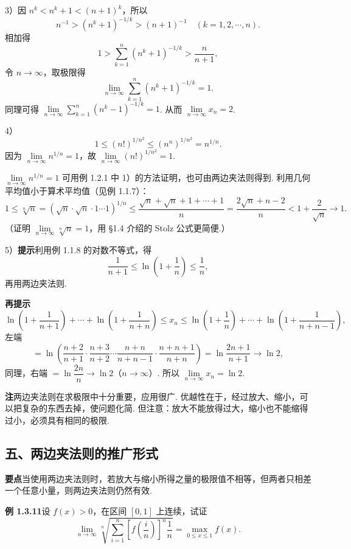 \documentclass[UTF8,12pt,a4paper,fontset=fandol]{ctexart}
\begin{document}
3）因 $n^k<n^k+1<(n+1)^k$，所以
\[
  n^{-1}>(n^k+1)^{-1/k}>(n+1)^{-1}\quad(k=1,2,\cdots,n).
\]
相加得
\[
  1>\sum_{k=1}^n(n^k+1)^{-1/k}>\frac n{n+1},
\]
令 $n\to\infty$，取极限得
\[
  \lim_{n\to\infty}\sum_{k=1}^n(n^k+1)^{-1/k}=1.
\]
同理可得 $\lim\limits_{n\to\infty}\sum\limits_{k=1}^n(n^k-1)^{-1/k}=1$. 从而 $\lim\limits_{n\to\infty}x_n=2$.

4）
\[
  1\le(n!)^{1/n^2}\le(n^n)^{1/n^2}=n^{1/n}.
\]
因为 $\lim\limits_{n\to\infty}n^{1/n}=1$，故 $\lim\limits_{n\to\infty}(n!)^{1/n^2}=1$.

$\lim\limits_{n\to\infty}n^{1/n}=1$ 可用例 1.2.1 中 1）的方法证明，也可由两边夹法则得到. 利用几何平均值小于算术平均值（见例 1.1.7）：
\[
1\le\sqrt[n]{n}=(\sqrt n\cdot\sqrt n\cdot1\cdots1)^{1/n}
\le\frac{\sqrt n+\sqrt n+1+\cdots+1}{n}
=\frac{2\sqrt n+n-2}{n}<1+\frac2{\sqrt n}\to1.
\]
（证明 $\lim\limits_{n\to\infty}\sqrt[n]{n}=1$，用 §1.4 介绍的 Stolz 公式更简便.）

5）\textbf{提示}\quad 利用例 1.1.8 的对数不等式，得
\[
\frac1{n+1}\le\ln\left(1+\frac1n\right)\le\frac1n,
\]
再用两边夹法则.

\noindent\textbf{再提示}\quad
\[
\ln\left(1+\frac1{n+1}\right)+\cdots+\ln\left(1+\frac1{n+n}\right)
\le x_n
\le \ln\left(1+\frac1n\right)+\cdots+\ln\left(1+\frac1{n+n-1}\right),
\]
左端
\[
=\ln\left(\frac{n+2}{n+1}\cdot\frac{n+3}{n+2}\cdots
\frac{n+n}{n+n-1}\cdot\frac{n+n+1}{n+n}\right)
=\ln\frac{2n+1}{n+1}\to\ln2,
\]
同理，右端 $=\ln\dfrac{2n}{n}\to\ln2$（$n\to\infty$）. 所以 $\lim\limits_{n\to\infty}x_n=\ln2$.

\noindent\textbf{注}\quad 两边夹法则在求极限中十分重要，应用很广. 优越性在于，经过放大、缩小，可以把复杂的东西去掉，使问题化简. 但注意：放大不能放得过大，缩小也不能缩得过小，必须具有相同的极限.

\subsection*{五、两边夹法则的推广形式}

\noindent\textbf{要点}\quad 当使用两边夹法则时，若放大与缩小所得之量的极限值不相等，但两者只相差一个任意小量，则两边夹法则仍然有效.

\noindent\textbf{例 1.3.11}\quad 设 $f(x)>0$，在区间 $[0,1]$ 上连续，试证
\[
  \lim_{n\to\infty}\sqrt[n]{\sum_{i=1}^n\left[f\left(\frac in\right)\right]^n\frac1n}
  =\max_{0\le x\le1}f(x).
\]
\end{document}
